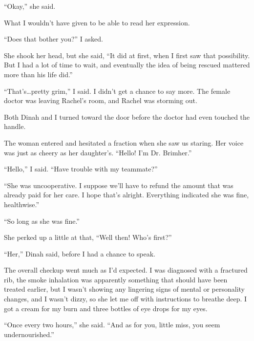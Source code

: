 ``Okay,'' she said.



What I wouldn't have given to be able to read her expression.



``Does that bother you?'' I asked.



She shook her head, but she said, ``It did at first, when I first saw that possibility.  But I had a lot of time to wait, and eventually the idea of being rescued mattered more than his life did.''



``That's\ldots pretty grim,'' I said.  I didn't get a chance to say more.  The female doctor was leaving Rachel's room, and Rachel was storming out.



Both Dinah and I turned toward the door before the doctor had even touched the handle.



The woman entered and hesitated a fraction when she saw us staring.  Her voice was just as cheery as her daughter's.  ``Hello!  I'm Dr. Brimher.''



``Hello,'' I said.  ``Have trouble with my teammate?''



``She was uncooperative.  I suppose we'll have to refund the amount that was already paid for her care.  I hope that's alright.  Everything indicated she was fine, healthwise.''



``So long as she was fine.''



She perked up a little at that, ``Well then!  Who's first?''



``Her,'' Dinah said, before I had a chance to speak.



The overall checkup went much as I'd expected.  I was diagnosed with a fractured rib, the smoke inhalation was apparently something that should have been treated earlier, but I wasn't showing any lingering signs of mental or personality changes, and I wasn't dizzy, so she let me off with instructions to breathe deep.  I got a cream for my burn and three bottles of eye drops for my eyes.



``Once every two hours,'' she said.  ``And as for you, little miss, you seem undernourished.''



